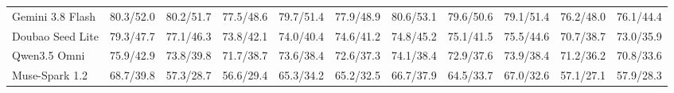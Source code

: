 \begin{table}[p]
\begin{tabular*}{\linewidth}{@{}l@{\hspace{3pt}\extracolsep{\fill}}*{10}{r}@{}}
Gemini 3.8 Flash & 80.3/52.0 & 80.2/51.7 & 77.5/48.6 & 79.7/51.4 & 77.9/48.9 & 80.6/53.1 & 79.6/50.6 & 79.1/51.4 & 76.2/48.0 & 76.1/44.4 \\
Doubao Seed Lite & 79.3/47.7 & 77.1/46.3 & 73.8/42.1 & 74.0/40.4 & 74.6/41.2 & 74.8/45.2 & 75.1/41.5 & 75.5/44.6 & 70.7/38.7 & 73.0/35.9 \\
Qwen3.5 Omni & 75.9/42.9 & 73.8/39.8 & 71.7/38.7 & 73.6/38.4 & 72.6/37.3 & 74.1/38.4 & 72.9/37.6 & 73.9/38.4 & 71.2/36.2 & 70.8/33.6 \\
Muse-Spark 1.2 & 68.7/39.8 & 57.3/28.7 & 56.6/29.4 & 65.3/34.2 & 65.2/32.5 & 66.7/37.9 & 64.5/33.7 & 67.0/32.6 & 57.1/27.1 & 57.9/28.3 \\
\bottomrule
\end{tabular*}
\endgroup
\end{table}
